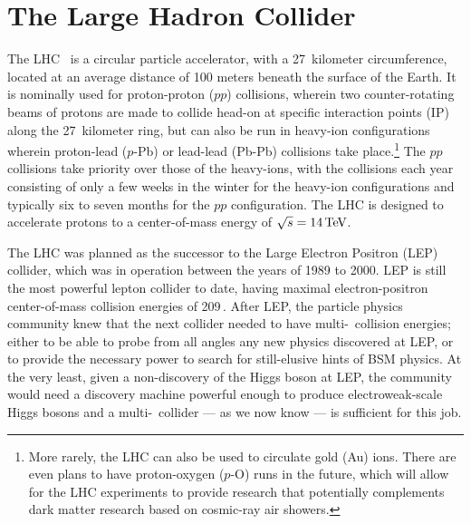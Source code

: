 \section{The Large Hadron Collider}
\label{sec:lhc}

The LHC~\cite{LHCMachine} is a circular particle accelerator, with a 27~kilometer circumference,
located at an average distance of 100 meters beneath the surface of the Earth.
It is nominally used for proton-proton ($pp$) collisions, wherein two counter-rotating
beams of protons are made to collide head-on at specific interaction points (IP) along the 27~kilometer
ring, but can also be run in heavy-ion configurations wherein proton-lead ($p$-Pb) or lead-lead (Pb-Pb)
collisions take place.\footnote{More rarely, the LHC can also be used to circulate gold (Au) ions.
There are even plans to have proton-oxygen ($p$-O) runs in the future, which will allow
for the LHC experiments to provide research that potentially complements dark matter research
based on cosmic-ray air showers.}
The $pp$ collisions take priority over those of the heavy-ions, with the collisions each year
consisting of only a few weeks in the winter for the heavy-ion configurations and typically
six to seven months for the $pp$ configuration. The LHC is designed to accelerate protons to a
center-of-mass energy of $\sqrt{s} = 14\,\text{Te\kern -0.1em V}$.

The LHC was planned as the successor to the Large Electron Positron (LEP) collider, which was in operation
between the years of 1989 to 2000. LEP is still the most powerful lepton collider to date, having maximal electron-positron
center-of-mass collision energies of 209\,\GeV.
After LEP, the particle physics community knew that the next collider needed to have multi-\TeV~collision
energies; either to be able to probe from all angles any new physics discovered at LEP, or
to provide the necessary power to search for still-elusive hints of BSM physics. At the very least,
given a non-discovery of the Higgs boson at LEP, the community would need a discovery machine powerful enough
to produce electroweak-scale Higgs bosons and a multi-\TeV~collider --- as we now know --- is sufficient for this job.



